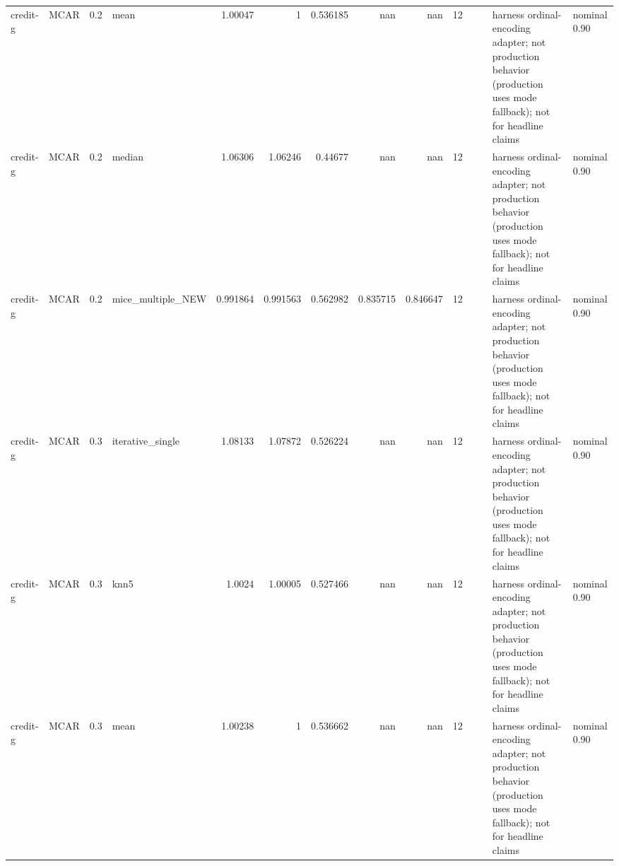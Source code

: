 \begin{table}[ht]
\begin{tabular}{llrlrrrrrrllll}
 credit-g             & MCAR        &         0.2 & mean              &       1.00047  &             1        &                 0.536185 &                     nan        &                       nan        &        12 &                    &                                         & harness ordinal-encoding adapter; not production behavior (production uses mode fallback); not for headline claims & nominal 0.90              \\
 credit-g             & MCAR        &         0.2 & median            &       1.06306  &             1.06246  &                 0.44677  &                     nan        &                       nan        &        12 &                    &                                         & harness ordinal-encoding adapter; not production behavior (production uses mode fallback); not for headline claims & nominal 0.90              \\
 credit-g             & MCAR        &         0.2 & mice\_multiple\_NEW &       0.991864 &             0.991563 &                 0.562982 &                       0.835715 &                         0.846647 &        12 &                    &                                         & harness ordinal-encoding adapter; not production behavior (production uses mode fallback); not for headline claims & nominal 0.90              \\
 credit-g             & MCAR        &         0.3 & iterative\_single  &       1.08133  &             1.07872  &                 0.526224 &                     nan        &                       nan        &        12 &                    &                                         & harness ordinal-encoding adapter; not production behavior (production uses mode fallback); not for headline claims & nominal 0.90              \\
 credit-g             & MCAR        &         0.3 & knn5              &       1.0024   &             1.00005  &                 0.527466 &                     nan        &                       nan        &        12 &                    &                                         & harness ordinal-encoding adapter; not production behavior (production uses mode fallback); not for headline claims & nominal 0.90              \\
 credit-g             & MCAR        &         0.3 & mean              &       1.00238  &             1        &                 0.536662 &                     nan        &                       nan        &        12 &                    &                                         & harness ordinal-encoding adapter; not production behavior (production uses mode fallback); not for headline claims & nominal 0.90              \\

\end{tabular}
\end{table}
